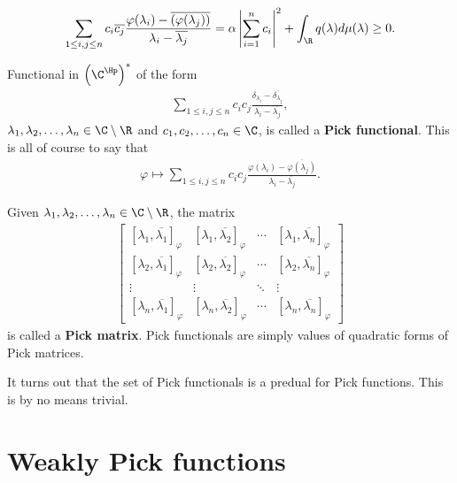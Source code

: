 \begin{align*}
	\sum_{1 \leq i, j \leq n} c_{i} \overline{c_{j}} \frac{\varphi(\lambda_{i}) - \overline{(\varphi(\lambda_{j}))}}{\lambda_{i} - \overline{\lambda_{j}}} = \alpha \left|\sum_{i = 1}^{n} c_{i}\right|^2 + \int_{\R} q(\lambda) d \mu (\lambda) \geq 0.
\end{align*}

\begin{maar}
	Functional in $\left(\C^{\Hp}\right)^{*}$ of the form
	\begin{align*}
		\sum_{1 \leq i, j \leq n} c_{i} c_{j} \frac{\delta_{\lambda_{i}} - \overline{\delta_{\lambda_{j}}}}{\lambda_{i} - \overline{\lambda_{j}}},
	\end{align*}
	$\lambda_{1}, \lambda_{2}, \ldots, \lambda_{n} \in \C \setminus \R$ and $c_{1}, c_{2}, \ldots, c_{n} \in \C$, is called a \textbf{Pick functional}. This is all of course to say that
	\begin{align*}
		\varphi \mapsto \sum_{1 \leq i, j \leq n} c_{i} c_{j} \frac{\varphi(\lambda_{i}) - \overline{\varphi(\lambda_{j})}}{\lambda_{i} - \overline{\lambda_{j}}}.
	\end{align*}
\end{maar}

Given $\lambda_{1}, \lambda_{2}, \ldots, \lambda_{n} \in \C \setminus \R$, the matrix
\begin{align*}\label{Pick_matrix}
	\begin{bmatrix}
		[\lambda_{1}, \overline{\lambda_{1}}]_{\varphi} & [\lambda_{1}, \overline{\lambda_{2}}]_{\varphi} & \cdots & [\lambda_{1}, \overline{\lambda_{n}}]_{\varphi} \\
		[\lambda_{2}, \overline{\lambda_{1}}]_{\varphi} & [\lambda_{2}, \overline{\lambda_{2}}]_{\varphi} & \cdots & [\lambda_{2}, \overline{\lambda_{n}}]_{\varphi} \\
		\vdots & \vdots & \ddots & \vdots \\
		[\lambda_{n}, \overline{\lambda_{1}}]_{\varphi} & [\lambda_{n}, \overline{\lambda_{2}}]_{\varphi} & \cdots &  [\lambda_{n}, \overline{\lambda_{n}}]_{\varphi}
	\end{bmatrix}
\end{align*}
is called a \textbf{Pick matrix}. Pick functionals are simply values of quadratic forms of Pick matrices.

It turns out that the set of Pick functionals is a predual for Pick functions. This is by no means trivial.

\section{Weakly Pick functions}


